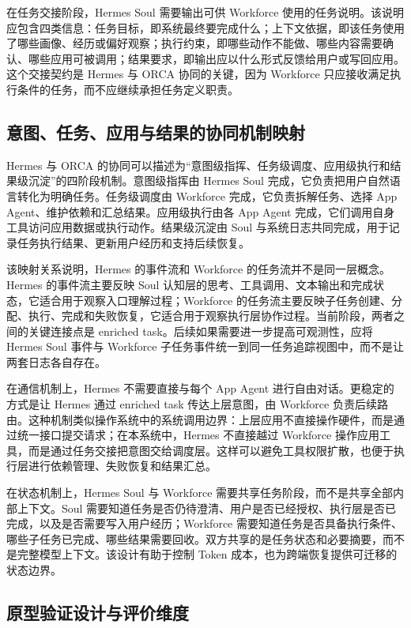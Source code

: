 在任务交接阶段，Hermes Soul 需要输出可供 Workforce 使用的任务说明。该说明应包含四类信息：任务目标，即系统最终要完成什么；上下文依据，即该任务使用了哪些画像、经历或偏好观察；执行约束，即哪些动作不能做、哪些内容需要确认、哪些应用可被调用；结果要求，即输出应以什么形式反馈给用户或写回应用。这个交接契约是 Hermes 与 ORCA 协同的关键，因为 Workforce 只应接收满足执行条件的任务，而不应继续承担任务定义职责。

\subsection{意图、任务、应用与结果的协同机制映射}

Hermes 与 ORCA 的协同可以描述为“意图级指挥、任务级调度、应用级执行和结果级沉淀”的四阶段机制。意图级指挥由 Hermes Soul 完成，它负责把用户自然语言转化为明确任务。任务级调度由 Workforce 完成，它负责拆解任务、选择 App Agent、维护依赖和汇总结果。应用级执行由各 App Agent 完成，它们调用自身工具访问应用数据或执行动作。结果级沉淀由 Soul 与系统日志共同完成，用于记录任务执行结果、更新用户经历和支持后续恢复。

该映射关系说明，Hermes 的事件流和 Workforce 的任务流并不是同一层概念。Hermes 的事件流主要反映 Soul 认知层的思考、工具调用、文本输出和完成状态，它适合用于观察入口理解过程；Workforce 的任务流主要反映子任务创建、分配、执行、完成和失败恢复，它适合用于观察执行层协作过程。当前阶段，两者之间的关键连接点是 enriched task。后续如果需要进一步提高可观测性，应将 Hermes Soul 事件与 Workforce 子任务事件统一到同一任务追踪视图中，而不是让两套日志各自存在。

在通信机制上，Hermes 不需要直接与每个 App Agent 进行自由对话。更稳定的方式是让 Hermes 通过 enriched task 传达上层意图，由 Workforce 负责后续路由。这种机制类似操作系统中的系统调用边界：上层应用不直接操作硬件，而是通过统一接口提交请求；在本系统中，Hermes 不直接越过 Workforce 操作应用工具，而是通过任务交接把意图交给调度层。这样可以避免工具权限扩散，也便于执行层进行依赖管理、失败恢复和结果汇总。

在状态机制上，Hermes Soul 与 Workforce 需要共享任务阶段，而不是共享全部内部上下文。Soul 需要知道任务是否仍待澄清、用户是否已经授权、执行层是否已完成，以及是否需要写入用户经历；Workforce 需要知道任务是否具备执行条件、哪些子任务已完成、哪些结果需要回收。双方共享的是任务状态和必要摘要，而不是完整模型上下文。该设计有助于控制 Token 成本，也为跨端恢复提供可迁移的状态边界。

\subsection{原型验证设计与评价维度}

